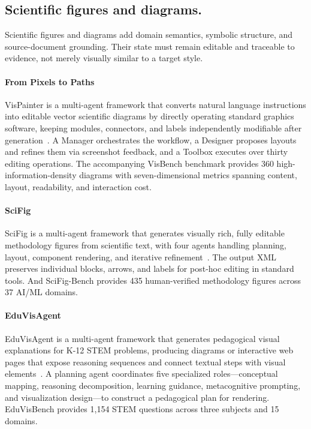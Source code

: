 \subsection{Scientific figures and diagrams.}
Scientific figures and diagrams add domain semantics, symbolic structure, and source-document grounding. Their state must remain editable and traceable to evidence, not merely visually similar to a target style.

\paragraph{From Pixels to Paths}
VisPainter is a multi-agent framework that converts natural language instructions into editable vector scientific diagrams by directly operating standard graphics software, keeping modules, connectors, and labels independently modifiable after generation~\cite{avg251027452}. A Manager orchestrates the workflow, a Designer proposes layouts and refines them via screenshot feedback, and a Toolbox executes over thirty editing operations. The accompanying VisBench benchmark provides 360 high-information-density diagrams with seven-dimensional metrics spanning content, layout, readability, and interaction cost.

\paragraph{SciFig}
SciFig is a multi-agent framework that generates visually rich, fully editable methodology figures from scientific text, with four agents handling planning, layout, component rendering, and iterative refinement~\cite{huang2026scifig}. The output XML preserves individual blocks, arrows, and labels for post-hoc editing in standard tools. And SciFig-Bench provides 435 human-verified methodology figures across 37 AI/ML domains. 

\paragraph{EduVisAgent}
EduVisAgent is a multi-agent framework that generates pedagogical visual explanations for K-12 STEM problems, producing diagrams or interactive web pages that expose reasoning sequences and connect textual steps with visual elements~\cite{avg250516832}. A planning agent coordinates five specialized roles—conceptual mapping, reasoning decomposition, learning guidance, metacognitive prompting, and visualization design—to construct a pedagogical plan for rendering. EduVisBench provides 1,154 STEM questions across three subjects and 15 domains.

